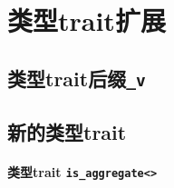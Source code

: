 \chapter{类型trait扩展}\label{ch21}

\section{类型trait后缀\texttt{\_v}}\label{ch21.1}

\section{新的类型trait}
\subsubsection{类型trait \texttt{is\_aggregate<>}}\label{ch21.2.1}